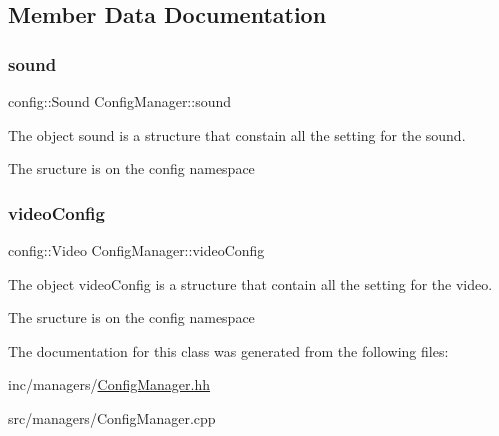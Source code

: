 \subsection{Member Data Documentation}
\mbox{\label{classConfigManager_a010e2da02ebc90d7ce930d1c57a79e96}} 
\subsubsection{\texorpdfstring{sound}{sound}}
{\footnotesize\ttfamily config\+::\+Sound Config\+Manager\+::sound}



The object sound is a structure that constain all the setting for the sound. 

The sructure is on the config namespace \mbox{\label{classConfigManager_a1e0dbb8563b71871e6c68abce5620cd0}} 
\subsubsection{\texorpdfstring{video\+Config}{videoConfig}}
{\footnotesize\ttfamily config\+::\+Video Config\+Manager\+::video\+Config}



The object video\+Config is a structure that contain all the setting for the video. 

The sructure is on the config namespace 

The documentation for this class was generated from the following files\+:\begin{DoxyCompactItemize}
\item 
inc/managers/\hyperlink{ConfigManager_8hh}{Config\+Manager.\+hh}\item 
src/managers/Config\+Manager.\+cpp\end{DoxyCompactItemize}
